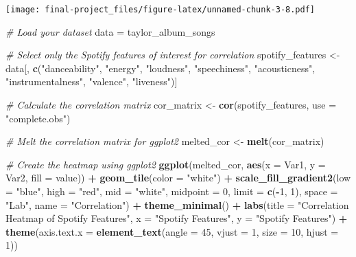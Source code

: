 \documentclass[
]{article}
\newenvironment{Shaded}{\begin{snugshade}}{\end{snugshade}}
\newcommand{\AttributeTok}[1]{\textcolor[rgb]{0.13,0.29,0.53}{#1}}
\newcommand{\CommentTok}[1]{\textcolor[rgb]{0.56,0.35,0.01}{\textit{#1}}}
\newcommand{\DecValTok}[1]{\textcolor[rgb]{0.00,0.00,0.81}{#1}}
\newcommand{\FunctionTok}[1]{\textcolor[rgb]{0.13,0.29,0.53}{\textbf{#1}}}
\newcommand{\NormalTok}[1]{#1}
\newcommand{\OtherTok}[1]{\textcolor[rgb]{0.56,0.35,0.01}{#1}}
\newcommand{\SpecialCharTok}[1]{\textcolor[rgb]{0.81,0.36,0.00}{\textbf{#1}}}
\newcommand{\StringTok}[1]{\textcolor[rgb]{0.31,0.60,0.02}{#1}}
\begin{document}
\texttt{[image: final-project\_files/figure-latex/unnamed-chunk-3-8.pdf]}

\begin{Shaded}
\begin{Highlighting}[]
\CommentTok{\# Load your dataset}
\NormalTok{data }\OtherTok{=}\NormalTok{ taylor\_album\_songs}

\CommentTok{\# Select only the Spotify features of interest for correlation}
\NormalTok{spotify\_features }\OtherTok{\textless{}{-}}\NormalTok{ data[, }\FunctionTok{c}\NormalTok{(}\StringTok{"danceability"}\NormalTok{, }\StringTok{"energy"}\NormalTok{, }\StringTok{"loudness"}\NormalTok{, }\StringTok{"speechiness"}\NormalTok{, }
                             \StringTok{"acousticness"}\NormalTok{, }\StringTok{"instrumentalness"}\NormalTok{, }\StringTok{"valence"}\NormalTok{, }\StringTok{"liveness"}\NormalTok{)]}

\CommentTok{\# Calculate the correlation matrix}
\NormalTok{cor\_matrix }\OtherTok{\textless{}{-}} \FunctionTok{cor}\NormalTok{(spotify\_features, }\AttributeTok{use =} \StringTok{"complete.obs"}\NormalTok{)}

\CommentTok{\# Melt the correlation matrix for ggplot2}
\NormalTok{melted\_cor }\OtherTok{\textless{}{-}} \FunctionTok{melt}\NormalTok{(cor\_matrix)}

\CommentTok{\# Create the heatmap using ggplot2}
\FunctionTok{ggplot}\NormalTok{(melted\_cor, }\FunctionTok{aes}\NormalTok{(}\AttributeTok{x =}\NormalTok{ Var1, }\AttributeTok{y =}\NormalTok{ Var2, }\AttributeTok{fill =}\NormalTok{ value)) }\SpecialCharTok{+}
  \FunctionTok{geom\_tile}\NormalTok{(}\AttributeTok{color =} \StringTok{"white"}\NormalTok{) }\SpecialCharTok{+}
  \FunctionTok{scale\_fill\_gradient2}\NormalTok{(}\AttributeTok{low =} \StringTok{"blue"}\NormalTok{, }\AttributeTok{high =} \StringTok{"red"}\NormalTok{, }\AttributeTok{mid =} \StringTok{"white"}\NormalTok{, }
                       \AttributeTok{midpoint =} \DecValTok{0}\NormalTok{, }\AttributeTok{limit =} \FunctionTok{c}\NormalTok{(}\SpecialCharTok{{-}}\DecValTok{1}\NormalTok{, }\DecValTok{1}\NormalTok{), }\AttributeTok{space =} \StringTok{"Lab"}\NormalTok{, }
                       \AttributeTok{name =} \StringTok{"Correlation"}\NormalTok{) }\SpecialCharTok{+}
  \FunctionTok{theme\_minimal}\NormalTok{() }\SpecialCharTok{+}
  \FunctionTok{labs}\NormalTok{(}\AttributeTok{title =} \StringTok{"Correlation Heatmap of Spotify Features"}\NormalTok{,}
       \AttributeTok{x =} \StringTok{"Spotify Features"}\NormalTok{,}
       \AttributeTok{y =} \StringTok{"Spotify Features"}\NormalTok{) }\SpecialCharTok{+}
  \FunctionTok{theme}\NormalTok{(}\AttributeTok{axis.text.x =} \FunctionTok{element\_text}\NormalTok{(}\AttributeTok{angle =} \DecValTok{45}\NormalTok{, }\AttributeTok{vjust =} \DecValTok{1}\NormalTok{, }
                                   \AttributeTok{size =} \DecValTok{10}\NormalTok{, }\AttributeTok{hjust =} \DecValTok{1}\NormalTok{))}
\end{Highlighting}
\end{Shaded}
\end{document}
